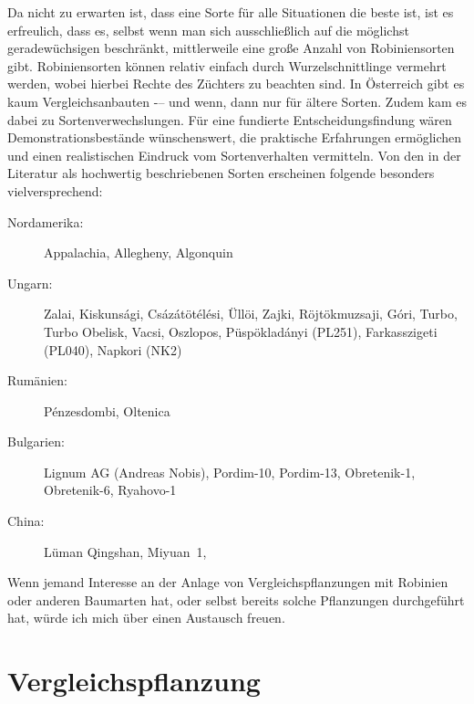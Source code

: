 \documentclass[twocolumn]{scrartcl}
\begin{document}
Da nicht zu erwarten ist, dass eine Sorte für alle Situationen die
beste ist, ist es erfreulich, dass es, selbst wenn man sich
ausschließlich auf die möglichst geradewüchsigen beschränkt, mittlerweile eine
große Anzahl von Robiniensorten gibt. Robiniensorten können relativ
einfach durch Wurzelschnittlinge vermehrt werden, wobei hierbei Rechte
des Züchters zu beachten sind.
In Österreich gibt es kaum Vergleichsanbauten -– und wenn, dann nur für ältere Sorten.
Zudem kam es dabei zu Sortenverwechslungen.
Für eine fundierte Entscheidungsfindung wären Demonstrationsbestände wünschenswert,
die praktische Erfahrungen ermöglichen und einen realistischen Eindruck vom Sortenverhalten vermitteln.
Von den in der Literatur als hochwertig beschriebenen Sorten erscheinen folgende besonders vielversprechend:

\begin{description}
\item[Nordamerika:] Appalachia, Allegheny, Algonquin
\item[Ungarn:] Zalai, Kiskunsági, Csázátötélési, Üllöi, Zajki, Röjtökmuzsaji, Góri, Turbo, Turbo Obelisk, Vacsi, Oszlopos, Püspökladányi (PL251), Farkasszigeti (PL040), Napkori (NK2)
\item[Rumänien:] Pénzesdombi, Oltenica
\item[Bulgarien:] Lignum AG (Andreas Nobis), Pordim-10, Pordim-13, Obretenik-1, Obretenik-6, Ryahovo-1
\item[China:] Lüman Qingshan, Miyuan~1,
\end{description}

Wenn jemand Interesse an der Anlage von Vergleichspflanzungen mit Robinien oder anderen Baumarten hat, oder selbst bereits solche Pflanzungen durchgeführt hat, würde ich mich über einen Austausch freuen.

\section{Vergleichspflanzung}
\end{document}
